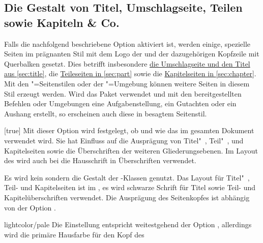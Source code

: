 \begin{Declaration*}{}
\begin{Declaration*}{}
\begin{Declaration*}{}
\subsection{Die Gestalt von Titel, Umschlagseite, Teilen sowie Kapiteln \& Co.}
%
%
%
%
Falls die nachfolgend beschriebene Option  aktiviert ist, 
werden einige, spezielle Seiten im prägnanten Stil mit dem Logo der \TnUD und 
der dazugehörigen Kopfzeile mit Querbalken gesetzt. Dies betrifft insbesondere 
\hyperref[sec:title]{die Umschlagseite und den Titel aus \autoref{sec:title}}, 
die \hyperref[sec:part]{Teileseiten in \autoref{sec:part}} sowie die
\hyperref[sec:chapter]{Kapitelseiten in \autoref{sec:chapter}}. Mit den 
"=Seitenstilen oder der "=Umgebung 
können weitere Seiten in diesem Stil erzeugt werden. Wird das Paket 
 verwendet und mit den bereitgestellten Befehlen oder 
Umgebungen eine Aufgabenstellung, ein Gutachten oder ein Aushang erstellt, so 
erscheinen auch diese in besagtem Seitenstil.
%
\begin{Declaration}[%
  v2.03!\Option{cd=bicolor}:%
    Farbeinsatz nur im Kopf mit farbig abgesetztem Querbalken;
  v2.03!\Option{cd=fullcolor}:%
    voller Farbeinsatz mit farbig abgesetztem Querbalken;%
  v2.04!\Option{cd=barcolor}:nur farbig abgesetzter Querbalken;%
  v2.06f:Überschriften verwenden auch bei \Option{cdfont=false} die Hausschrift,
  falls das Layout des \CDs nicht mit \Option{cd=false} deaktiviert wurde%
]{}[true]
\printdeclarationlist%
%
Mit dieser Option wird festgelegt, ob und wie das \TUDCD im gesamten Dokument 
verwendet wird. Sie hat Einfluss auf die Ausprägung von Titel"~, Teil"~, und 
Kapitelseiten sowie die Überschriften der weiteren Gliederungsebenen. Im Layout 
des \CDs wird auch bei  die Hausschrift in Überschriften 
verwendet.
%
\begin{values}{}
\itemfalse
  Es wird kein \CD sondern die Gestalt der \KOMAScript-Klassen genutzt.
  Das Layout für Titel"~, Teil- und Kapitelseiten ist im \CD, es wird 
  schwarze Schrift für Titel sowie Teil- und Kapitelüberschriften verwendet.
  Die Ausprägung des Seitenkopfes ist abhängig von der Option .
\item[lightcolor/pale]
  Die Einstellung entspricht weitestgehend der Option , 
  allerdings wird die primäre Hausfarbe  für den Kopf des 

\end{values}
\end{Declaration}
\end{Declaration*}
\end{Declaration*}
\end{Declaration*}
